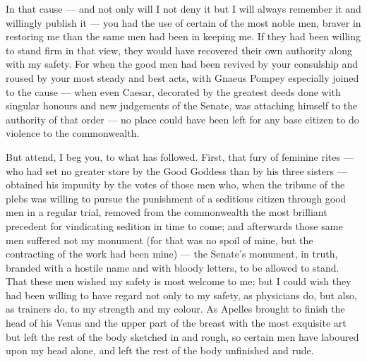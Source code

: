  In that cause --- and not only will I not deny it but I will always remember it and willingly publish it --- you had the use of certain of the most noble men, braver in restoring me than the same men had been in keeping me. If they had been willing to stand firm in that view, they would have recovered their own authority along with my safety. For when the good men had been revived by your consulship and roused by your most steady and best acts, with Gnaeus Pompey especially joined to the cause --- when even Caesar, decorated by the greatest deeds done with singular honours and new judgements of the Senate, was attaching himself to the authority of that order --- no place could have been left for any base citizen to do violence to the commonwealth.

 But attend, I beg you, to what has followed. First, that fury of feminine rites --- who had set no greater store by the Good Goddess than by his three sisters --- obtained his impunity by the votes of those men who, when the tribune of the plebs was willing to pursue the punishment of a seditious citizen through good men in a regular trial, removed from the commonwealth the most brilliant precedent for vindicating sedition in time to come; and afterwards those same men suffered not my monument (for that was no spoil of mine, but the contracting of the work had been mine) --- the Senate's monument, in truth, branded with a hostile name and with bloody letters, to be allowed to stand. That these men wished my safety is most welcome to me; but I could wish they had been willing to have regard not only to my safety, as physicians do, but also, as trainers do, to my strength and my colour. As Apelles brought to finish the head of his Venus and the upper part of the breast with the most exquisite art but left the rest of the body sketched in and rough, so certain men have laboured upon my head alone, and left the rest of the body unfinished and rude.

